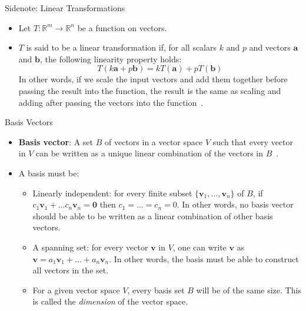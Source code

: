 \documentclass[aspectratio=169,xcolor=dvipsnames]{beamer}
\begin{document}


\begin{frame}{Sidenote: Linear Transformations}
      \begin{itemize}
            \item Let $T : \mathbb{R}^m \to \mathbb{R}^n$ be a function on vectors.
            \item $T$ is said to be a linear transformation if, for all scalars $k$ and $p$
                  and vectors $\mathbf{a}$ and $\mathbf{b}$, the following linearity
                  property holds:
                  $$T(k\mathbf{a} + p\mathbf{b}) = kT(\mathbf{a}) + pT(\mathbf{b})$$
                  In other words, if we scale the input vectors and add them together before
                  passing the result into the function, the result is the same as
                  scaling and adding after passing the vectors into the function~\cite{kuttler_first_2008}.
      \end{itemize}
\end{frame}


\begin{frame}{Basis Vectors}
      \begin{itemize}
            \item \textbf{Basis vector}: A set $B$ of vectors in a vector space $V$ such that every 
            vector in $V$ can be written as a unique linear combination of the vectors 
            in $B$~\cite{Wikipedia_Basis_2025}.
            \item A basis must be:
            \begin{itemize}
                  \item Linearly independent: for every finite subset $\{\mathbf{v}_1,\ldots,\mathbf{v}_n\}$
                        of $B$, if $c_1\mathbf{v}_1+\ldots c_n\mathbf{v}_n = \mathbf{0}$ then
                        $c_1=\ldots= c_n = 0$. In other words, no basis vector should be able to
                        be written as a linear combination of other basis vectors.
                  \item A spanning set: for every vector $\mathbf{v}$ in $V$, one can
                        write $\mathbf{v}$ as $\mathbf{v} = a_1\mathbf{v}_1+\ldots+a_n\mathbf{v}_n$.
                        In other words, the basis must be able to construct all vectors in the set.
                  \item For a given vector space $V$, every basis set $B$ will be of the same size.
                        This is called the \textit{dimension} of the vector space.
            \end{itemize}
      \end{itemize}
\end{frame}
\end{document}

